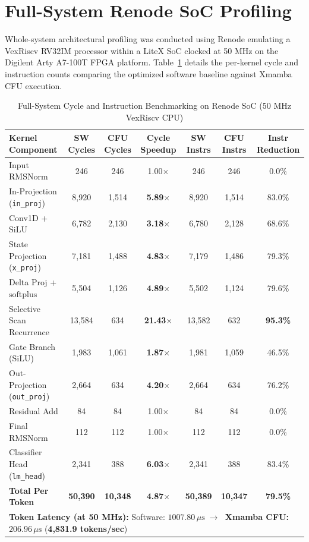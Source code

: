 \documentclass[11pt,a4paper,oneside]{report}
\begin{document}
\section{Full-System Renode SoC Profiling}
Whole-system architectural profiling was conducted using Renode emulating a VexRiscv RV32IM processor within a LiteX SoC clocked at 50 MHz on the Digilent Arty A7-100T FPGA platform. Table~\ref{tab:renode_profiling} details the per-kernel cycle and instruction counts comparing the optimized software baseline against Xmamba CFU execution.

\begin{table}[!htbp]
\caption[Full-System Cycle and Instruction Benchmarking on Renode SoC (50 MHz)]{Full-System Cycle and Instruction Benchmarking on Renode SoC (50 MHz VexRiscv CPU)}
\label{tab:renode_profiling}
\centering
\begin{tabularx}{\linewidth}{lcccccc}
\toprule
\textbf{Kernel Component} & \textbf{SW Cycles} & \textbf{CFU Cycles} & \textbf{Cycle Speedup} & \textbf{SW Instrs} & \textbf{CFU Instrs} & \textbf{Instr Reduction} \\
\midrule
Input RMSNorm & 246 & 246 & 1.00$\times$ & 246 & 246 & 0.0\% \\
In-Projection (\texttt{in\_proj}) & 8,920 & 1,514 & \textbf{5.89$\times$} & 8,920 & 1,514 & 83.0\% \\
Conv1D + $\text{SiLU}$ & 6,782 & 2,130 & \textbf{3.18$\times$} & 6,780 & 2,128 & 68.6\% \\
State Projection (\texttt{x\_proj}) & 7,181 & 1,488 & \textbf{4.83$\times$} & 7,179 & 1,486 & 79.3\% \\
Delta Proj + $\text{softplus}$ & 5,504 & 1,126 & \textbf{4.89$\times$} & 5,502 & 1,124 & 79.6\% \\
Selective Scan Recurrence & 13,584 & 634 & \textbf{21.43$\times$} & 13,582 & 632 & \textbf{95.3\%} \\
Gate Branch ($\text{SiLU}$) & 1,983 & 1,061 & \textbf{1.87$\times$} & 1,981 & 1,059 & 46.5\% \\
Out-Projection (\texttt{out\_proj}) & 2,664 & 634 & \textbf{4.20$\times$} & 2,664 & 634 & 76.2\% \\
Residual Add & 84 & 84 & 1.00$\times$ & 84 & 84 & 0.0\% \\
Final RMSNorm & 112 & 112 & 1.00$\times$ & 112 & 112 & 0.0\% \\
Classifier Head (\texttt{lm\_head}) & 2,341 & 388 & \textbf{6.03$\times$} & 2,341 & 388 & 83.4\% \\
\midrule
\textbf{Total Per Token} & \textbf{50,390} & \textbf{10,348} & \textbf{4.87$\times$} & \textbf{50,389} & \textbf{10,347} & \textbf{79.5\%} \\
\midrule
\multicolumn{7}{l}{\textbf{Token Latency (at 50 MHz):} Software: $1007.80\,\mu\text{s} \;\longrightarrow\;$ \textbf{Xmamba CFU: $206.96\,\mu\text{s}$} (\textbf{4,831.9 tokens/sec})} \\
\bottomrule
\end{tabularx}
\end{table}
\end{document}
